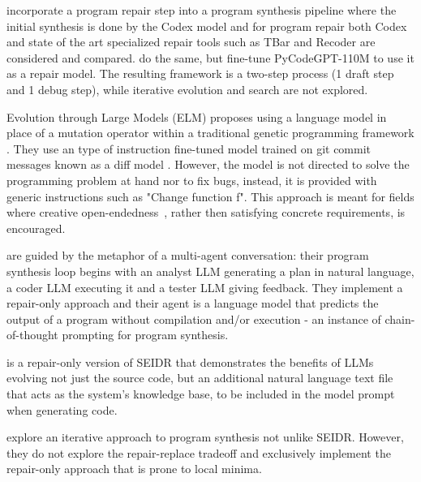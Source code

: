 \cite{fanAutomatedRepairPrograms2023} incorporate a program repair step into a program synthesis pipeline where the initial synthesis is done by the Codex model \cite{chenEvaluatingLargeLanguage2021} and for program repair both Codex and state of the art specialized repair tools such as TBar and Recoder \cite{Defects4JDatabaseExisting} are considered and compared. \cite{zhangSelfEditFaultAwareCode2023} do the same, but fine-tune PyCodeGPT-110M \cite{zanCERTContinualPretraining2022} to use it as a repair model. The resulting framework is a two-step process (1 draft step and 1 debug step), while iterative evolution and search are not explored. 

Evolution through Large Models (ELM) \cite{lehmanEvolutionLargeModels2022} proposes using a language model in place of a mutation operator within a traditional genetic programming framework \cite{koza1994:genetic}. They use an type of instruction fine-tuned model trained on git commit messages known as a diff model \cite{DiffModelsNew2023}. However, the model is not directed to solve the programming problem at hand nor to fix bugs, instead, it is provided with generic instructions such as "Change function f". This approach is meant for fields where creative open-endedness~\cite{stanleyWhyGreatnessCannot2015a}, rather then satisfying concrete requirements, is encouraged.

\cite{dongSelfcollaborationCodeGeneration2023} are guided by the metaphor of a multi-agent conversation: their program synthesis loop begins with an analyst LLM generating a plan in natural language, a coder LLM executing it and a tester LLM giving feedback. They implement a repair-only approach and their \execute{} agent is a language model that predicts the output of a program without compilation and/or execution - an instance of chain-of-thought prompting \cite{yuBetterChainofThoughtPrompting2023} for program synthesis.

\cite{jiangSelfEvolveCodeEvolution2023} is a repair-only version of SEIDR that demonstrates the benefits of LLMs evolving not just the source code, but an additional natural language text file that acts as the system's knowledge base, to be included in the model prompt when generating code.

\cite{xiaConversationalAutomatedProgram2023,chenTeachingLargeLanguage2023,shinnReflexionLanguageAgents2023} explore an iterative approach to program synthesis not unlike SEIDR. However, they do not explore the repair-replace tradeoff and exclusively implement the repair-only approach that is prone to local minima.

